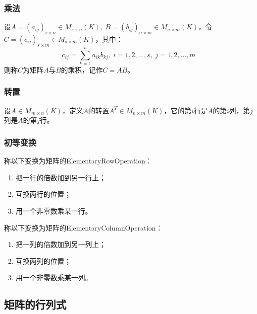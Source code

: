 \subsubsection{乘法}
\begin{definition}
	设$A=(a_{ij})_{s\times n}\in M_{s\times n}(K),\;B=(b_{ij})_{n\times m}\in M_{n\times m}(K)$，令$C=(c_{ij})_{s\times m}\in M_{s\times m}(K)$，其中：
	\begin{equation*}
		c_{ij}=\sum_{k=1}^{n}a_{ik}b_{kj},\;i=1,2,\dots,s,\;j=1,2,\dots,m
	\end{equation*}
	则称$C$为矩阵$A$与$B$的乘积，记作$C=AB$。
\end{definition}
\subsubsection{转置}
\begin{definition}
	设$A\in M_{m\times n}(K)$，定义$A$的转置$A^T\in M_{n\times m}(K)$，它的第$i$行是$A$的第$i$列，第$j$列是$A$的第$j$行。
\end{definition}
\subsubsection{初等变换}
\begin{definition}
	称以下变换为矩阵的\gls{ElementaryRowOperation}：
	\begin{enumerate}
		\item 把一行的倍数加到另一行上；
		\item 互换两行的位置；
		\item 用一个非零数乘某一行。
	\end{enumerate}
	称以下变换为矩阵的\gls{ElementaryColumnOperation}：
	\begin{enumerate}
		\item 把一列的倍数加到另一列上；
		\item 互换两列的位置；
		\item 用一个非零数乘某一列。
	\end{enumerate}
\end{definition}
\subsection{矩阵的行列式}
